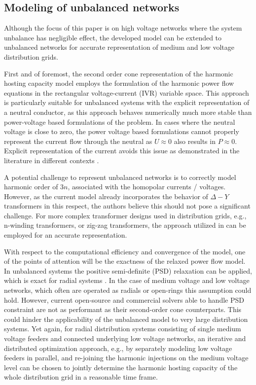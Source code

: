 \subsection{Modeling of unbalanced networks}

Although the focus of this paper is on high voltage networks where the system unbalance has negligible effect, the developed model can be extended to unbalanced networks for accurate representation of medium and low voltage distribution grids.

First and of foremost, the second order cone representation of the harmonic hosting capacity model employs the formulation of the harmonic power flow equations in the rectangular voltage-current (IVR) variable space. This approach is particularly suitable for unbalanced systems with the explicit representation of a neutral conductor, as this approach behaves numerically much more stable than power-voltage based formulations of the problem. In cases where the neutral voltage is close to zero, the power voltage based formulations cannot properly represent the current flow through the neutral as $U \approx 0$ also results in $P \approx 0 $. Explicit representation of the current avoids this issue as demonstrated in the literature in different contexts \cite{claeys_applications_2021, jat_hybrid_2024}.

A potential challenge to represent unbalanced networks is to correctly model harmonic order of $3n$, associated with the homopolar currents / voltages. However, as the current model already incorporates the behavior of $\Delta - Y$ transformers in this respect, the authors believe this should not pose a significant challenge. For more complex transformer designs used in distribution grids, e.g., n-winding transformers, or zig-zag transformers, the approach utilized in \cite{claeys_decomposition_2020} can be employed for an accurate representation.

With respect to the computational efficiency and convergence of the model, one of the points of attention will be the exactness of the relaxed power flow model. In unbalanced systems the positive semi-definite (PSD) relaxation can be applied, which is exact for radial systems \cite{geth_pitfalls_2023}. In the case of medium voltage and low voltage networks, which often are operated as radials or open-rings this assumption could hold. However, current open-source and commercial solvers able to handle PSD constraint are not as performant as their second-order cone counterparts. This could hinder the applicability of the unbalanced model to very large distribution systems. Yet again, for radial distribution systems consisting of single medium voltage feeders and connected underlying low voltage networks, an iterative and distributed optimization approach, e.g., by separately modeling low voltage feeders in parallel, and re-joining the harmonic injections on the medium voltage level can be chosen to jointly determine the harmonic hosting capacity of the whole distribution grid in a reasonable time frame.